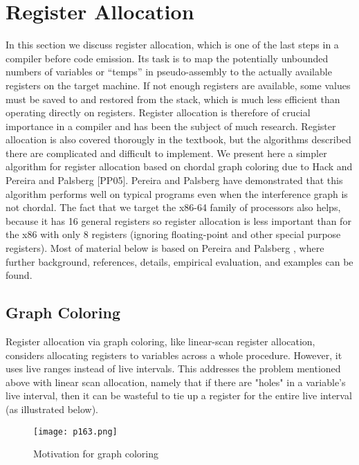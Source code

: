 \newpage

\section{Register Allocation}

In this section\cite{REGISTER78:online} we discuss register allocation, which is one of the last steps
in a compiler before code emission. Its task is to map the potentially unbounded numbers of variables or “temps” in pseudo-assembly to the actually available registers on the target machine. If not enough registers are
available, some values must be saved to and restored from the stack, which
is much less efficient than operating directly on registers. Register allocation is therefore of crucial importance in a compiler and has been the subject of much research. Register allocation is also covered thorougly in the
textbook, but the algorithms described there are complicated and difficult to implement. We present here a simpler algorithm
for register allocation based on chordal graph coloring due to Hack \cite{hack2006register}
and Pereira and Palsberg [PP05]. Pereira and Palsberg have demonstrated
that this algorithm performs well on typical programs even when the interference graph is not chordal. The fact that we target the x86-64 family
of processors also helps, because it has 16 general registers so register allocation is less important than for the x86 with only 8 registers (ignoring
floating-point and other special purpose registers).
Most of material below is based on Pereira and Palsberg \cite{pereira2005register}, where
further background, references, details, empirical evaluation, and examples can be found.




\subsection{Graph Coloring}


Register allocation via graph coloring, like linear-scan register allocation, considers allocating registers to variables across a whole procedure. However, it uses live ranges instead of live intervals. This addresses the problem mentioned above with linear scan allocation, namely that if there are "holes" in a variable's live interval, then it can be wasteful to tie up a register for the entire live interval (as illustrated below).


\begin{figure}[H]
	\centering
	\texttt{[image: p163.png]}
	\caption{Motivation for graph coloring}
	\label{fig:p163}
\end{figure}



